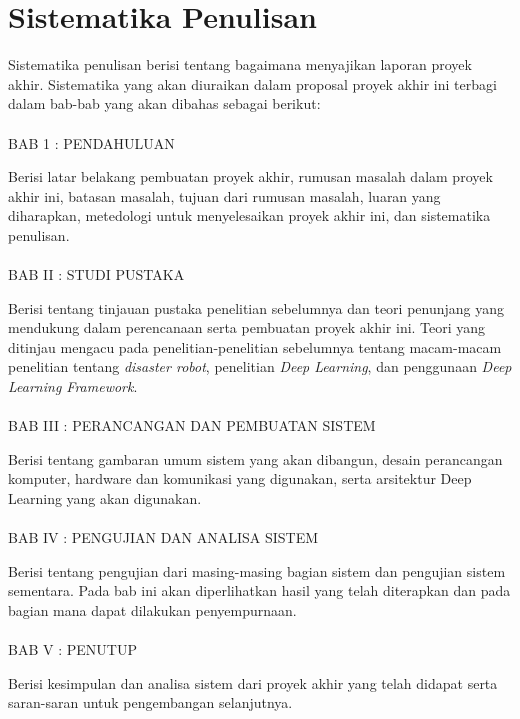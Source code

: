 \section{Sistematika Penulisan}  %

Sistematika penulisan berisi tentang bagaimana menyajikan laporan proyek akhir. Sistematika yang akan diuraikan dalam proposal proyek akhir ini terbagi dalam bab-bab yang akan dibahas sebagai berikut:
\\
\\
BAB 1 : PENDAHULUAN

Berisi latar belakang pembuatan proyek akhir, rumusan masalah dalam proyek akhir ini, batasan masalah, tujuan dari rumusan masalah, luaran yang diharapkan, metedologi untuk menyelesaikan proyek akhir ini, dan sistematika penulisan.
\\
\\
BAB II : STUDI PUSTAKA

Berisi tentang tinjauan pustaka penelitian sebelumnya dan teori penunjang yang mendukung dalam perencanaan serta pembuatan proyek akhir ini. Teori yang ditinjau mengacu pada penelitian-penelitian sebelumnya tentang macam-macam penelitian tentang \textit{disaster robot}, penelitian \textit{Deep Learning}, dan penggunaan \textit{Deep Learning Framework}.
\\
\\
BAB III : PERANCANGAN DAN PEMBUATAN SISTEM

Berisi tentang gambaran umum sistem yang akan dibangun, desain perancangan komputer, hardware dan komunikasi yang digunakan, serta arsitektur Deep Learning yang akan digunakan.
\\
\\
BAB IV : PENGUJIAN DAN ANALISA SISTEM

Berisi tentang pengujian dari masing-masing bagian sistem dan pengujian sistem sementara. Pada bab ini akan diperlihatkan hasil yang telah diterapkan dan pada bagian mana dapat dilakukan penyempurnaan.
\\
\\
BAB V : PENUTUP

Berisi kesimpulan dan analisa sistem dari proyek akhir yang telah didapat serta saran-saran untuk pengembangan selanjutnya.

